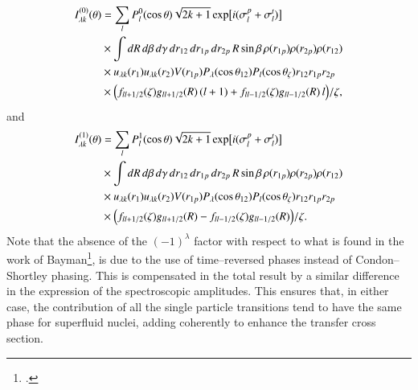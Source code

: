 \begin{equation}\label{eq111}
  \begin{split}
  I_{\lambda k}^{(0)}(\theta)&=\sum_{l}P_l^0(\cos\theta)
  \sqrt{2k+1}\exp\bigl[i(\sigma_{l}^p+\sigma_{l}^t)\bigr]\\
  &\times  \int dR \, d\beta\, d\gamma \, dr_{12}\,dr_{1p}\,dr_{2p}\,R\sin\beta\,\rho(r_{1p})\rho(r_{2p})\rho(r_{12})   \\
  &\times u_{\lambda k}(r_1)u_{\lambda k}(r_2)V(r_{1p})
  P_\lambda(\cos \theta_{12})P_l(\cos \theta_\zeta)r_{12}r_{1p}r_{2p}\\
  &\times \Bigl(f_{ll+1/2}(\zeta)g_{ll+1/2}(R)\,(l+1)+f_{ll-1/2}(\zeta)g_{ll-1/2}(R)\,l\Bigr)/\zeta,
  \end{split}
\end{equation}
and
\begin{equation}\label{eq112}
  \begin{split}
  I_{\lambda k}^{(1)}(\theta)&=\sum_{l}P_l^1(\cos\theta)
  \sqrt{2k+1}\exp\bigl[i(\sigma_{l}^p+\sigma_{l}^t)\bigr]\\
  &\times  \int dR \, d\beta\, d\gamma \, dr_{12}\,dr_{1p}\,dr_{2p}\,R\sin\beta \,\rho(r_{1p})\rho(r_{2p})\rho(r_{12})  \\
  &\times u_{\lambda k}(r_1)u_{\lambda k}(r_2)V(r_{1p})
  P_\lambda(\cos \theta_{12})P_l(\cos \theta_\zeta)r_{12}r_{1p}r_{2p}\\
  &\times \Bigl(f_{ll+1/2}(\zeta)g_{ll+1/2}(R)-f_{ll-1/2}(\zeta)g_{ll-1/2}(R)\Bigr)/\zeta.
  \end{split}
\end{equation}
Note that the absence of the $(-1)^\lambda$ factor with respect to what is found in the work of Bayman\footnote{  \cite{Bayman:71}.}, is due to the use of time--reversed phases instead of Condon--Shortley phasing. This is compensated in the total result by a similar difference in the expression of the spectroscopic amplitudes. This ensures that, in either case, the contribution of all the single particle transitions tend to have the same phase for superfluid nuclei, adding coherently to enhance the transfer cross section.
